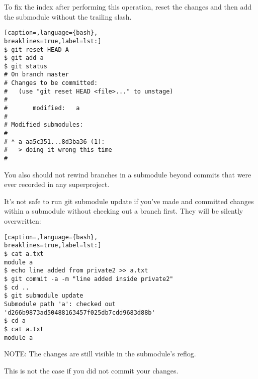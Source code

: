 To fix the index after performing this operation, reset the changes and then
add the submodule without the trailing slash.
\lstset{basicstyle=\scriptsize, numbers=none, captionpos=b, tabsize=4}
\begin{lstlisting}[caption=,language={bash},
breaklines=true,label=lst:]
$ git reset HEAD A
$ git add a
$ git status
# On branch master
# Changes to be committed:
#   (use "git reset HEAD <file>..." to unstage)
#
#       modified:   a
#
# Modified submodules:
#
# * a aa5c351...8d3ba36 (1):
#   > doing it wrong this time
#
\end{lstlisting}

You also should not rewind branches in a submodule beyond commits that were
ever recorded in any superproject.

It's not safe to run git submodule update if you've made and committed changes
within a submodule without checking out a branch first. They will be silently
overwritten:
\lstset{basicstyle=\scriptsize, numbers=none, captionpos=b, tabsize=4}
\begin{lstlisting}[caption=,language={bash},
breaklines=true,label=lst:]
$ cat a.txt
module a
$ echo line added from private2 >> a.txt
$ git commit -a -m "line added inside private2"
$ cd ..
$ git submodule update
Submodule path 'a': checked out 'd266b9873ad50488163457f025db7cdd9683d88b'
$ cd a
$ cat a.txt
module a
\end{lstlisting}

NOTE: The changes are still visible in the submodule's reflog.

This is not the case if you did not commit your changes.
